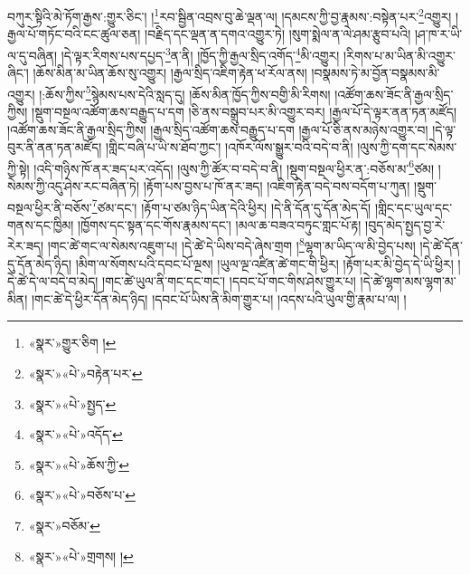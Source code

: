 \documentclass[12pt,a4paper]{book}
\begin{document}
བཀུར་སྟིའི་མེ་ཏོག་རྒྱས་:གྱུར་ཅིང་། །\footnote{«སྣར་»གྱུར་ཅིག །}རབ་སྦྱིན་འབྲས་བུ་ཆེ་ལྡན་ལ། །དམངས་ཀྱི་བྱ་རྣམས་:བསྟེན་པར་\footnote{«སྣར་»«པེ་»བརྟེན་པར་}འགྱུར། །རྒྱལ་པོ་གཏོང་བའི་ངང་ཚུལ་ཅན། །བརྗིད་དང་ལྡན་ན་དགའ་འགྱུར་ཏེ། །སུག་སྨེལ་ན་ལེ་ཤམ་རྩུབ་པའི། །ཤ་ཁ་ར་ཡི་ལ་དུ་བཞིན། །དེ་ལྟར་རིགས་པས་དཔྱད་\footnote{«སྣར་»«པེ་»སྤྱད་}ན་ནི། །ཁྱོད་ཀྱི་རྒྱལ་སྲིད་འགོད་\footnote{«སྣར་»«པེ་»འདོད་}མི་འགྱུར། །རིགས་པ་མ་ཡིན་མི་འགྱུར་ཞིང་། །ཆོས་མིན་མ་ཡིན་ཆོས་སུ་འགྱུར། །རྒྱལ་སྲིད་འཇིག་རྟེན་ཕ་རོལ་ནས། །བསྣམས་ཏེ་མ་བྱོན་བསྣམས་མི་འགྱུར། །:ཆོས་ཀྱིས་\footnote{«སྣར་»«པེ་»ཆོས་ཀྱི་}སྙེམས་པས་དེའི་སླད་དུ། །ཆོས་མིན་ཁྱོད་ཀྱིས་བགྱི་མི་རིགས། །འཚོག་ཆས་ཟོང་ནི་རྒྱལ་སྲིད་ཀྱིས། །སྡུག་བསྔལ་འཚོག་ཆས་བརྒྱུད་པ་དག །ཅི་ནས་བསྒྲུབ་པར་མི་འགྱུར་བར། །རྒྱལ་པོ་དེ་ལྟར་ནན་ཏན་མཛོད། །འཚོག་ཆས་ཟོང་ནི་རྒྱལ་སྲིད་ཀྱིས། །རྒྱལ་སྲིད་འཚོག་ཆས་བརྒྱུད་པ་དག །རྒྱལ་པོ་ཅི་ནས་མཉེས་འགྱུར་བ། །དེ་ལྟ་བུར་ནི་ནན་ཏན་མཛོད། །གླིང་བཞི་པ་ཡི་ས་ཐོབ་ཀྱང་། །འཁོར་ལོས་སྒྱུར་བའི་བདེ་བ་ནི། །ལུས་ཀྱི་དག་དང་སེམས་ཀྱི་སྟེ། །འདི་གཉིས་ཁོ་ནར་ཟད་པར་འདོད། །ལུས་ཀྱི་ཚོར་བ་བདེ་བ་ནི། །སྡུག་བསྔལ་ཕྱིར་ན་:བཅོས་མ་\footnote{«སྣར་»«པེ་»བཅོས་པ་}ཙམ། །སེམས་ཀྱི་འདུ་ཤེས་རང་བཞིན་ཏེ། །རྟོག་པས་བྱས་པ་ཁོ་ནར་ཟད། །འཇིག་རྟེན་བདེ་བས་བདོག་པ་ཀུན། །སྡུག་བསྔལ་ཕྱིར་ནི་བཅོས་\footnote{«སྣར་»བཅོམ་}ཙམ་དང་། །རྟོག་པ་ཙམ་ཉིད་ཡིན་དེའི་ཕྱིར། །དེ་ནི་དོན་དུ་དོན་མེད་དོ། །གླིང་དང་ཡུལ་དང་གནས་དང་ཁྱིམ། །ཁྱོགས་དང་སྟན་དང་གོས་རྣམས་དང་། །མལ་ཆ་བཟའ་བཏུང་གླང་པོ་རྟ། །བུད་མེད་སྤྱད་བྱ་རེ་རེར་ཟད། །གང་ཚེ་གང་ལ་སེམས་འཇུག་པ། །དེ་ཚེ་དེ་ཡིས་བདེ་ཞེས་གྲག །\footnote{«སྣར་»«པེ་»གྲགས། །}ལྷག་མ་ཡིད་ལ་མི་བྱེད་པས། །དེ་ཚེ་དོན་དུ་དོན་མེད་ཉིད། །མིག་ལ་སོགས་པའི་དབང་པོ་ལྔས། །ཡུལ་ལྔ་འཛིན་ཚེ་གང་གི་ཕྱིར། །རྟོག་པར་མི་བྱེད་དེ་ཡི་ཕྱིར། །དེ་ཚེ་དེ་ལ་བདེ་བ་མེད། །གང་ཚེ་ཡུལ་ནི་གང་དང་གང་། །དབང་པོ་གང་གིས་ཤེས་གྱུར་པ། །དེ་ཚེ་ལྷག་མས་ལྷག་མ་མིན། །གང་ཚེ་དེ་ཕྱིར་དོན་མེད་ཉིད། །དབང་པོ་ཡིས་ནི་མིག་གྱུར་པ། །འདས་པའི་ཡུལ་གྱི་རྣམ་པ་ལ། །
\end{document}
